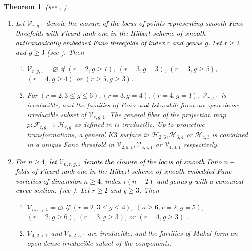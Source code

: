 \documentclass[11pt,twoside]{amsart}
\theoremstyle{plain}
\numberwithin{equation}{section}
\newtheorem{theorem}{Theorem}[section]
\theoremstyle{definition}
\begin{document}
\begin{theorem}(see , )\label{classification of mukai varieties intro}
\begin{enumerate}
    \item Let \textcolor{black}{$\mathcal{V}_{r,g,1}$ denote the closure of the locus of points representing smooth Fano threefolds with Picard rank one in the Hilbert scheme of smooth anticanonically embedded Fano threefolds of index $r$ and genus $g$. Let $r \geq 2$ and $g \geq 3$ (see )}.
    Then

\begin{enumerate}
    \item $\mathcal{V}_{r,g,1} = \varnothing$ if $(r = 2, g \geq 7)$, $(r = 3, g = 3)$, $(r = 3, g \geq 5)$, $(r = 4, g \geq 4)$ or $(r \geq 5, g \geq 3)$. 
    \item For $(r = 2, 3 \leq g \leq 6), (r = 3, g = 4), (r = 4, g = 3)$, $\mathcal{V}_{r,g,1}$ is irreducible, and the families of Fano and Iskovskih form an open dense irreducible subset of $\mathcal{V}_{r,g,1}$. The general fiber of the projection map $p: \mathcal{F}_{r,g} \to \mathcal{H}_{r,g}$ as defined in  is irreducible. Up to projective transformations, a general $K3$ surface in $\mathcal{H}_{2,6}, \mathcal{H}_{3,4}$ or $ \mathcal{H}_{4,3}$ is contained in a unique Fano threefold in $\mathcal{V}_{2,6,1}, \mathcal{V}_{3,4,1}$ or $ \mathcal{V}_{4,3,1}$ respectively.
\end{enumerate}

\item \textcolor{black}{For $n \geq 4$, let $\mathcal{V}_{n,r,g,1}$ denote the closure of the locus of smooth Fano $n-$ folds of Picard rank one in the Hilbert scheme of smooth embedded Fano varieties of dimension $n \geq 4$, index $r(n-2)$ and genus $g$ with a canonical curve section. (see ). Let $r \geq 2$ and $g \geq 3$}.
Then 
\begin{enumerate}
    \item $\mathcal{V}_{n,r,g,1} = \varnothing$ if $(r = 2, 3 \leq g \leq 4)$, $(n \geq 6, r = 2, g = 5)$, $(r = 2, g \geq 6)$, $(r = 3, g \geq 3)$, or $(r = 4, g \geq 3)$ . 
    \item $\mathcal{V}_{4,2,5,1}$ and $\mathcal{V}_{5,2,5,1}$ are irreducible, and the families of Mukai form an open dense irreducible subset of the components.
\end{enumerate}

\end{enumerate} 

\end{theorem}
\end{document}

